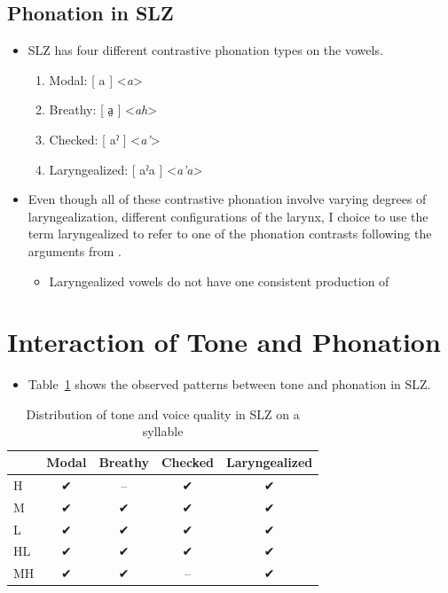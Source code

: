 \documentclass[12pt, letterpaper]{article}
\begin{document}
\subsection{Phonation in SLZ} \label{sec:Phonation}

\begin{itemize}
	\item SLZ has four different contrastive phonation types on the vowels. 
	\begin{enumerate}
		\item Modal: [ a ] <\textit{a}>
		\item Breathy: [ a̤ ] <\textit{ah}> 
		\item Checked: [ aˀ ] <\textit{a'}> 
		\item Laryngealized: [ aˀa ] <\textit{a'a}> 
	\end{enumerate}
	\item Even though all of these contrastive phonation involve varying degrees of laryngealization, different configurations of the larynx, I choice to use the term laryngealized to refer to one of the phonation contrasts following the arguments from \citet{avelinoAcousticElectroglottographicAnalyses2010}.
	\begin{itemize}
		\item Laryngealized vowels do not have one consistent production of 
	\end{itemize}
\end{itemize}

\section{Interaction of Tone and Phonation} \label{sec:Interaction}

\begin{itemize}
	\item Table~\ref{tab:ToneVoiceQuality} shows the observed patterns between tone and phonation in SLZ. 
\end{itemize}

\vspace{-20pt}
\begin{table}[!h]
	\caption{Distribution of tone and voice quality in SLZ on a syllable}
	\label{tab:ToneVoiceQuality}
	\centering

	\begin{tabular}{lcccc}
	\hline

	\hline
		& \textbf{Modal} & \textbf{Breathy} & \textbf{Checked} & \textbf{Laryngealized} \\
	\hline
	H	& ✔ & -- & ✔ & ✔ \\
	M	& ✔ & ✔ & ✔ & ✔\\
	L	& ✔	& ✔ & ✔ & ✔\\
	HL	& ✔	& ✔ & ✔ & ✔\\
	MH	& ✔	& ✔ & -- & ✔ \\
	\hline

	\hline
	\end{tabular}
\end{table}
\end{document}
